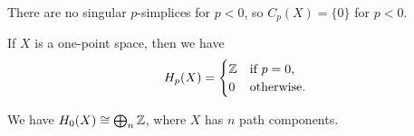 \begin{remark}
  There are no singular $p$-simplices for $p < 0$,
  so $C_p(X) = \{0\}$ for $p < 0$.
\end{remark}

\begin{lemma}
  If $X$ is a one-point space, then we have
  \[
    H_p(X) =
    \begin{cases}
      \mathbb{Z} & \text{if $p = 0$}, \\
      0 & \text{otherwise}.
    \end{cases}
  \]
\end{lemma}

\begin{lemma}
  We have $H_0(X) \cong \bigoplus_n \mathbb{Z}$,
  where $X$ has $n$ path components.
\end{lemma}
